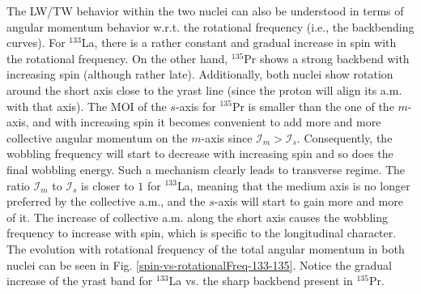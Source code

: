 The LW/TW behavior within the two nuclei can also be understood in terms of angular momentum behavior w.r.t. the rotational frequency (i.e., the backbending curves). For $^{133}$La, there is a rather constant and gradual increase in spin with the rotational frequency. On the other hand, $^{135}$Pr shows a strong backbend with increasing spin (although rather late). Additionally, both nuclei show rotation around the short axis close to the yrast line (since the proton will align its a.m. with that axis). The MOI of the $s$-axis for $^{135}$Pr is smaller than the one of the $m$-axis, and with increasing spin it becomes convenient to add more and more collective angular momentum on the $m$-axis since $\mathcal{I}_m>\mathcal{I}_s$. Consequently, the wobbling frequency will start to decrease with increasing spin and so does the final wobbling energy. Such a mechanism clearly leads to transverse regime. The ratio $\mathcal{I}_m$ to $\mathcal{I}_s$ is closer to $1$ for $^{133}$La, meaning that the medium axis is no longer preferred by the collective a.m., and the $s$-axis will start to gain more and more of it. The increase of collective a.m. along the short axis causes the wobbling frequency to increase with spin, which is specific to the longitudinal character. The evolution with rotational frequency of the total angular momentum in both nuclei can be seen in Fig. \ref{spin-vs-rotationalFreq-133-135}. Notice the gradual increase of the yrast band for $^{133}$La vs. the sharp backbend present in $^{135}$Pr.
